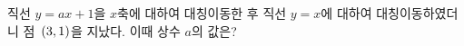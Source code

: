 직선 $y=ax+1$을 $x$축에 대하여 대칭이동한 후 직선 $y=x$에 대하여 대칭이동하였더니 점~$(3{,}\mkern3mu\mathopen{}1)$을 지났다. 이때 상수 $a$의 값은?

